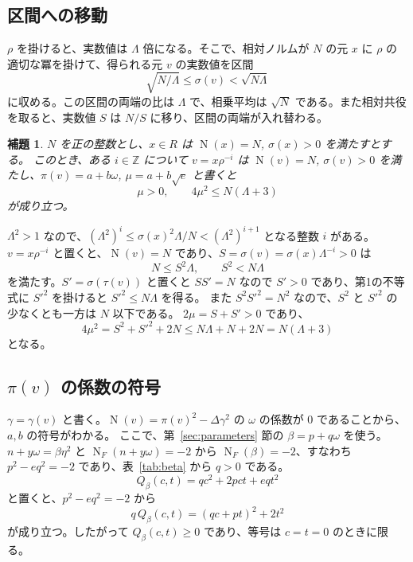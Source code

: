 \documentclass[a4paper,11pt]{ltjsarticle}
\makeatletter
\theoremstyle{jplain}
\newtheorem{lemma}[theorem]{補題}
\renewcommand{\proofname}{証明}
\renewenvironment{proof}[1][\proofname]{\par\pushQED{\qed}\normalfont\topsep6\p@\@plus6\p@\relax
  \trivlist\item[\hskip\labelsep\bfseries #1]\ignorespaces}{\popQED\endtrivlist\@endpefalse}
\numberwithin{equation}{section}
\numberwithin{table}{section}
\newcommand{\Z}{\mathbb{Z}}
\newcommand{\Nm}{\operatorname{N}}
\newcommand{\NF}{\operatorname{N}_F}
\newcommand{\tsec}[2]{\texorpdfstring{#1}{#2}}
\makeatother
\begin{document}
\subsection{区間への移動}

$\rho$ を掛けると、実数値は $\Lambda$ 倍になる。そこで、相対ノルムが $N$ の元 $x$ に $\rho$ の適切な冪を掛けて、得られる元 $v$ の実数値を区間
\[
\sqrt{N/\Lambda}\le\sigma(v)<\sqrt{N\Lambda}
\]
に収める。この区間の両端の比は $\Lambda$ で、相乗平均は $\sqrt N$ である。また相対共役を取ると、実数値 $S$ は $N/S$ に移り、区間の両端が入れ替わる。

\begin{lemma}\label{lem:window}
$N$ を正の整数とし、$x\in R$ は $\Nm(x)=N$, $\sigma(x)>0$ を満たすとする。
このとき、ある $i\in\Z$ について $v=x\rho^{-i}$ は $\Nm(v)=N$, $\sigma(v)>0$ を満たし、$\pi(v)=a+b\omega$, $\mu=a+b\sqrt e$ と書くと
\begin{equation}\label{eq:window}
\mu>0,\qquad 4\mu^2\le N(\Lambda+3)
\end{equation}
が成り立つ。
\end{lemma}

\begin{proof}
$\Lambda^2>1$ なので、$(\Lambda^2)^i\le\sigma(x)^2\Lambda/N<(\Lambda^2)^{i+1}$ となる整数 $i$ がある。
$v=x\rho^{-i}$ と置くと、$\Nm(v)=N$ であり、$S=\sigma(v)=\sigma(x)\Lambda^{-i}>0$ は
\[
N\le S^2\Lambda,\qquad S^2<N\Lambda
\]
を満たす。$S'=\sigma(\tau(v))$ と置くと $SS'=N$ なので $S'>0$ であり、第1の不等式に $S'^2$ を掛けると $S'^2\le N\Lambda$ を得る。
また $S^2S'^2=N^2$ なので、$S^2$ と $S'^2$ の少なくとも一方は $N$ 以下である。
$2\mu=S+S'>0$ であり、
\[
4\mu^2=S^2+S'^2+2N\le N\Lambda+N+2N=N(\Lambda+3)
\]
となる。
\end{proof}

\subsection{\tsec{$\pi(v)$}{pi(v)} の係数の符号}

$\gamma=\gamma(v)$ と書く。$\Nm(v)=\pi(v)^2-\Delta\gamma^2$ の $\omega$ の係数が $0$ であることから、$a,b$ の符号がわかる。
ここで、第~\ref{sec:parameters} 節の $\beta=p+q\omega$ を使う。$n+y\omega=\beta\eta^2$ と $\NF(n+y\omega)=-2$ から $\NF(\beta)=-2$、すなわち $p^2-eq^2=-2$ であり、表~\ref{tab:beta} から $q>0$ である。
\[
Q_\beta(c,t)=qc^2+2pct+eqt^2
\]
と置くと、$p^2-eq^2=-2$ から
\begin{equation}\label{eq:qbeta}
q\,Q_\beta(c,t)=(qc+pt)^2+2t^2
\end{equation}
が成り立つ。したがって $Q_\beta(c,t)\ge0$ であり、等号は $c=t=0$ のときに限る。
\end{document}
